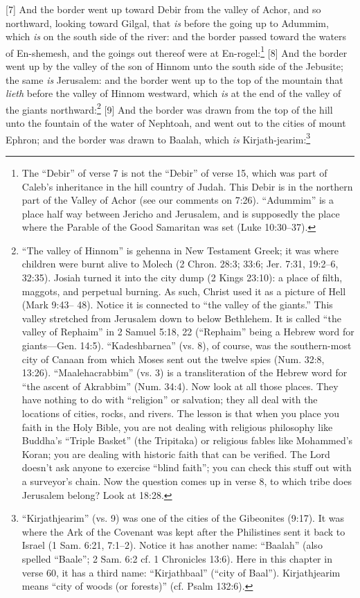 [7] \textcolor[rgb]{0.00,0.00,1.00}{And the border went up toward Debir from the valley of Achor, and so northward, looking toward Gilgal, that \emph{is} before the going up to Adummim, which \emph{is} on the south side of the river: and the border passed toward the waters of En-shemesh, and the goings out thereof were at En-rogel:}\footnote{The “Debir” of verse 7 is not the “Debir”
of verse 15, which was part of Caleb’s
inheritance in the hill country of Judah. This
Debir is in the northern part of the Valley of
Achor (see our comments on 7:26).
“Adummim” is a place half way between
Jericho and Jerusalem, and is supposedly the
place where the Parable of the Good Samaritan
was set (Luke 10:30–37).}
[8] \textcolor[rgb]{0.00,0.00,1.00}{And the border went up by the valley of the son of Hinnom unto the south side of the Jebusite; the same \emph{is} Jerusalem: and the border went up to the top of the mountain that \emph{lieth} before the valley of Hinnom westward, which \emph{is} at the end of the valley of the giants northward:}\footnote{“The valley of Hinnom” is gehenna in
New Testament Greek; it was where children
were burnt alive to Molech (2 Chron. 28:3;
33:6; Jer. 7:31, 19:2–6, 32:35). Josiah turned it
into the city dump (2 Kings 23:10): a place of
filth, maggots, and perpetual burning. As such,
Christ used it as a picture of Hell (Mark 9:43–
48). Notice it is connected to “the valley of the
giants.” This valley stretched from Jerusalem
down to below Bethlehem. It is called “the
valley of Rephaim” in 2 Samuel 5:18, 22
(“Rephaim” being a Hebrew word for
giants—Gen. 14:5). “Kadeshbarnea” (vs. 8), of course, was
the southern-most city of Canaan from which
Moses sent out the twelve spies (Num. 32:8,
13:26). “Maalehacrabbim” (vs. 3) is a
transliteration of the Hebrew word for “the
ascent of Akrabbim” (Num. 34:4).
Now look at all those places. They have
nothing to do with “religion” or salvation; they
all deal with the locations of cities, rocks, and
rivers. The lesson is that when you place you
faith in the Holy Bible, you are not dealing with
religious philosophy like Buddha’s “Triple
Basket” (the Tripitaka) or religious fables like
Mohammed’s Koran; you are dealing with
historic faith that can be verified. The Lord
doesn’t ask anyone to exercise “blind faith”;
you can check this stuff out with a surveyor’s
chain.
Now the question comes up in verse 8, to
which tribe does Jerusalem belong? Look at
18:28.}
[9] \textcolor[rgb]{0.00,0.00,1.00}{And the border was drawn from the top of the hill unto the fountain of the water of Nephtoah, and went out to the cities of mount Ephron; and the border was drawn to Baalah, which \emph{is} Kirjath-jearim:}\footnote{“Kirjathjearim” (vs. 9) was one of the cities of the Gibeonites (9:17). It was where the Ark of the Covenant was kept after the Philistines sent it back to Israel (1 Sam. 6:21, 7:1--2). Notice it has another name: “Baalah” (also spelled “Baale”; 2 Sam. 6:2 cf. 1 Chronicles 13:6). Here in this chapter in verse 60, it has a third name: “Kirjathbaal” (“city of Baal”).
Kirjathjearim means “city of woods (or forests)” (cf. Psalm 132:6).}
